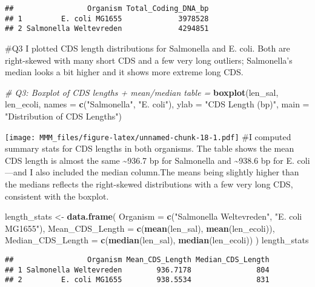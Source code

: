 \documentclass[
]{article}
\newenvironment{Shaded}{\begin{snugshade}}{\end{snugshade}}
\newcommand{\AttributeTok}[1]{\textcolor[rgb]{0.13,0.29,0.53}{#1}}
\newcommand{\CommentTok}[1]{\textcolor[rgb]{0.56,0.35,0.01}{\textit{#1}}}
\newcommand{\FunctionTok}[1]{\textcolor[rgb]{0.13,0.29,0.53}{\textbf{#1}}}
\newcommand{\NormalTok}[1]{#1}
\newcommand{\OtherTok}[1]{\textcolor[rgb]{0.56,0.35,0.01}{#1}}
\newcommand{\StringTok}[1]{\textcolor[rgb]{0.31,0.60,0.02}{#1}}
\begin{document}
\begin{verbatim}
##                 Organism Total_Coding_DNA_bp
## 1         E. coli MG1655             3978528
## 2 Salmonella Weltevreden             4294851
\end{verbatim}

\#Q3 I plotted CDS length distributions for Salmonella and E. coli. Both
are right-skewed with many short CDS and a few very long outliers;
Salmonella's median looks a bit higher and it shows more extreme long
CDS.

\begin{Shaded}
\begin{Highlighting}[]
\CommentTok{\# Q3: Boxplot of CDS lengths + mean/median table  =}
\FunctionTok{boxplot}\NormalTok{(len\_sal, len\_ecoli,}
        \AttributeTok{names =} \FunctionTok{c}\NormalTok{(}\StringTok{"Salmonella"}\NormalTok{, }\StringTok{"E. coli"}\NormalTok{),}
        \AttributeTok{ylab =} \StringTok{"CDS Length (bp)"}\NormalTok{,}
        \AttributeTok{main =} \StringTok{"Distribution of CDS Lengths"}\NormalTok{)}
\end{Highlighting}
\end{Shaded}

\texttt{[image: MMM\_files/figure-latex/unnamed-chunk-18-1.pdf]} \#I
computed summary stats for CDS lengths in both organisms. The table
shows the mean CDS length is almost the same \textasciitilde936.7 bp for
Salmonella and \textasciitilde938.6 bp for E. coli---and I also included
the median column.The means being slightly higher than the medians
reflects the right-skewed distributions with a few very long CDS,
consistent with the boxplot.

\begin{Shaded}
\begin{Highlighting}[]
\NormalTok{length\_stats }\OtherTok{\textless{}{-}} \FunctionTok{data.frame}\NormalTok{(}
  \AttributeTok{Organism =} \FunctionTok{c}\NormalTok{(}\StringTok{"Salmonella Weltevreden"}\NormalTok{, }\StringTok{"E. coli MG1655"}\NormalTok{),}
  \AttributeTok{Mean\_CDS\_Length   =} \FunctionTok{c}\NormalTok{(}\FunctionTok{mean}\NormalTok{(len\_sal), }\FunctionTok{mean}\NormalTok{(len\_ecoli)),}
  \AttributeTok{Median\_CDS\_Length =} \FunctionTok{c}\NormalTok{(}\FunctionTok{median}\NormalTok{(len\_sal), }\FunctionTok{median}\NormalTok{(len\_ecoli))}
\NormalTok{)}
\NormalTok{length\_stats}
\end{Highlighting}
\end{Shaded}

\begin{verbatim}
##                 Organism Mean_CDS_Length Median_CDS_Length
## 1 Salmonella Weltevreden        936.7178               804
## 2         E. coli MG1655        938.5534               831
\end{verbatim}
\end{document}
